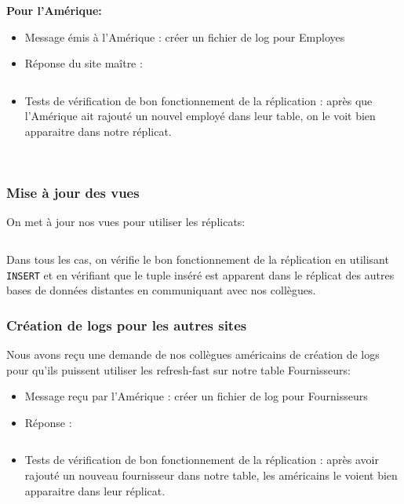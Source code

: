 \documentclass[10pt,a4paper]{article}
\theoremstyle{plain}
\begin{document}
\textbf{Pour l'Amérique:}

\begin{itemize}
    \item Message émis à l'Amérique : créer un fichier de log pour Employes
    \item Réponse du site maître : 
    
\inputminted{sql}{INSA-DB12-EuropeNord-rep-am.sql}
    
    \item Tests de vérification de bon fonctionnement de la réplication : après que l'Amérique ait rajouté un nouvel employé dans leur table, on le voit bien apparaitre dans notre réplicat.
\end{itemize}

~\\

\subsubsection{Mise à jour des vues}

On met à jour nos vues pour utiliser les réplicats:
\inputminted{sql}{INSA-DB12-EuropeNord-vues-replicats.sql}
Dans tous les cas, on vérifie le bon fonctionnement de la réplication en utilisant \verb|INSERT| et en vérifiant que le tuple inséré est apparent dans le réplicat des autres bases de données distantes en communiquant avec nos collègues.

\subsubsection{Création de logs pour les autres sites}

Nous avons reçu une demande de nos collègues américains de création de logs pour qu'ils puissent utiliser les refresh-fast sur notre table Fournisseurs:

\begin{itemize}
    \item Message reçu par l'Amérique : créer un fichier de log pour Fournisseurs
    \item Réponse : 
    
\inputminted{sql}{INSA-DB12-EuropeNord-rep-eu-n.sql}
    
    \item Tests de vérification de bon fonctionnement de la réplication : après avoir  rajouté un nouveau fournisseur dans notre table, les américains le voient bien apparaitre dans leur réplicat.
\end{itemize}
\end{document}
